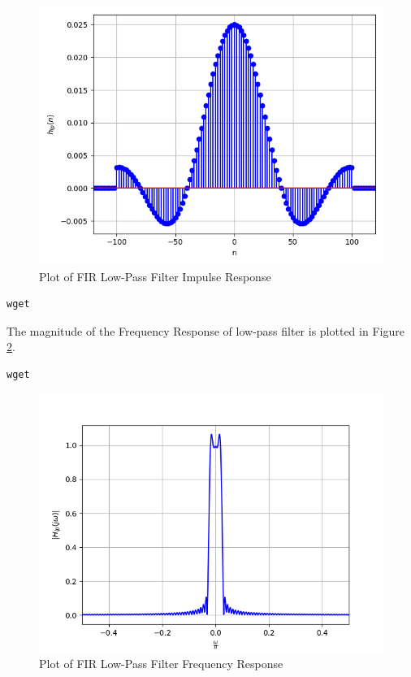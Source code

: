\documentclass{article}
\begin{document}
\begin{figure}[!h]
    \centering
    \includegraphics[width = \columnwidth]{figs/fir_hlp.png}
    \caption{Plot of FIR Low-Pass Filter Impulse Response}
    \label{fig:6}
\end{figure}
\begin{lstlisting}[caption = {Code for Figure 6}]
wget 
\end{lstlisting}
The magnitude of the Frequency Response of low-pass filter is plotted in Figure \ref{fig:7}.
\begin{lstlisting}[caption = {Code for Figure 7}]
wget 
\end{lstlisting}
\begin{figure}[!h]
    \centering
    \includegraphics[width = \columnwidth]{figs/firHLP.png}
    \caption{Plot of FIR Low-Pass Filter Frequency Response}
    \label{fig:7}
\end{figure}
\end{document}

